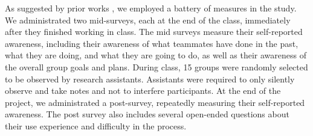 As suggested by prior works \cite{Neale2004,Goyal2014}, we employed a battery of measures in the study. We administrated two mid-surveys, each at the end of the class, immediately after they finished working in class. The mid surveys measure their self-reported awareness, including their awareness of what teammates have done in the past, what they are doing, and what they are going to do, as well as their awareness of the overall group goals and plans. During class, 15 groups were randomly selected to be observed by research assistants. Assistants were required to only silently observe and take notes and not to interfere participants. At the end of the project, we administrated a post-survey, repeatedly measuring their self-reported awareness. The post survey also includes several open-ended questions about their use experience and difficulty in the process.




